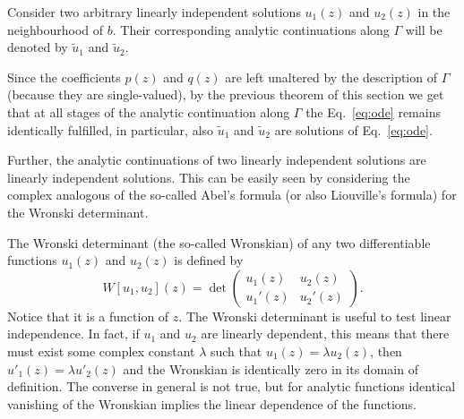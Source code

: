 Consider two arbitrary linearly independent solutions $u_{1}(z)$ and $u_{2}(z)$
in the neighbourhood of $b$.  Their corresponding analytic continuations along
$\Gamma$ will be denoted by $\tilde{u}_{1}$ and $\tilde{u}_{2}$.

Since the coefficients $p(z)$ and $q(z)$ are left unaltered by the description
of $\Gamma$ (because they are single-valued), by the previous theorem of this
section we get that at all stages of the analytic continuation along $\Gamma$
the Eq.~\eqref{eq:ode} remains identically fulfilled, in particular, also
$\tilde{u}_{1} $ and $\tilde{u}_{2}$ are solutions of Eq.~\eqref{eq:ode}.

Further, the analytic continuations of two linearly independent solutions are
linearly independent solutions.
This can be easily seen by considering the complex analogous of the so-called
Abel's formula (or also Liouville's formula) for the Wronski determinant.


The Wronski determinant
 (the so-called Wronskian) of any two
differentiable functions
$u_{1}(z)$ and $u_{2}(z)$ is defined by 
\begin{dmath}[label={wronskian},compact]
   W[u_{1}, u_{2}](z) = \det \begin{pmatrix} 
      u_{1} (z) & u_{2}(z) \\
      u_{1}'(z) & u_{2}'(z) \end{pmatrix}  .
\end{dmath}
Notice that it is a function of $z$. The Wronski determinant is useful
to test linear independence. In fact,
if $u_{1}$ and $u_{2}$ are 
linearly dependent, this means that there must exist some complex constant $\lambda$
such that $u_{1}(z) = \lambda
u_{2}(z)$, then $u'_{1} (z) = \lambda u'_{2} (z)$ and
the Wronskian  is
identically zero in its domain of definition.
The
converse in general is not true,
but for analytic functions identical vanishing
of the Wronskian implies the linear dependence of the functions.


